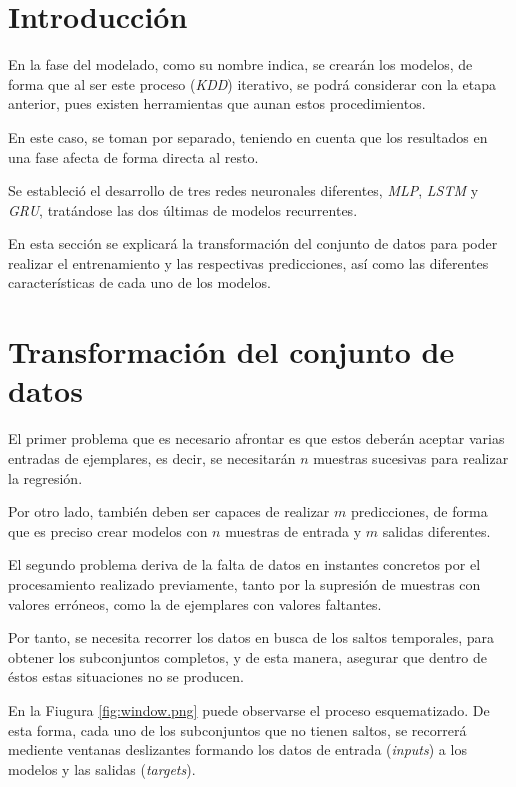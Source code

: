 
\section{Introducción}
En la fase del modelado, como su nombre indica, se crearán los modelos, de forma que al ser
este proceso (\textit{KDD}) iterativo, se podrá considerar con la etapa anterior, pues existen
herramientas que aunan estos procedimientos.

En este caso, se toman por separado, teniendo en cuenta que los resultados en una
fase afecta de forma directa al resto.

Se estableció el desarrollo de tres redes neuronales diferentes, \textit{MLP}, 
\textit{LSTM} y \textit{GRU}, tratándose las dos últimas de modelos recurrentes.

En esta sección se explicará la transformación del conjunto de datos para poder
realizar el entrenamiento y las respectivas predicciones, así como
las diferentes características de cada uno de los modelos.

\section{Transformación del conjunto de datos}
El primer problema que es necesario afrontar es que estos deberán aceptar varias
entradas de ejemplares, es decir, se necesitarán \(n\) muestras sucesivas para realizar la
regresión.

Por otro lado, también deben ser capaces de realizar \(m\) predicciones, de forma que 
es preciso crear modelos con \(n\) muestras de entrada y \(m\) salidas diferentes.

El segundo problema deriva de la falta de datos en instantes concretos por el procesamiento
realizado previamente, tanto por la supresión de muestras con valores erróneos, como
la de ejemplares con valores faltantes.

Por tanto, se necesita recorrer los datos en busca de los saltos temporales, para obtener
los subconjuntos completos, y de esta manera, asegurar que dentro de éstos estas situaciones
no se producen.


En la Fiugura \ref{fig:window.png} puede observarse el proceso esquematizado.
De esta forma, cada uno de los subconjuntos que no tienen saltos, se recorrerá 
mediente ventanas deslizantes formando los datos de entrada (\textit{inputs}) a los 
modelos y las salidas (\textit{targets}).

